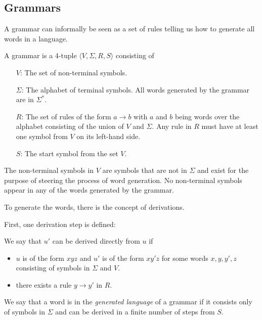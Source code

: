 \subsection{Grammars}\label{subsec:grammars}

A grammar can informally be seen as a set of rules telling us how to generate all words in a language.

\begin{define}[Grammar]
    A grammar is a 4-tuple $\langle V, \Sigma, R, S \rangle$ consisting of
    \begin{itemize}
        \item[$V$:] The set of non-terminal symbols.
        \item[$\Sigma$:] The alphabet of terminal symbols.
        All words generated by the grammar are in $\Sigma^{*}$.
        \item[$R$:] The set of rules of the form $a \to b$ with $a$ and $b$ being words over the alphabet consisting of the union of $V$ and $\Sigma$.
        Any rule in $R$ must have at least one symbol from $V$ on its left-hand side.
        \item[$S$:] The start symbol from the set $V$.
    \end{itemize}
\end{define}

The non-terminal symbols in $V$ are symbols that are not in $\Sigma$ and exist for the purpose of steering the process of word generation.
No non-terminal symbols appear in any of the words generated by the grammar.

To generate the words, there is the concept of derivations.
\begin{define}[Derivation]
    First, one derivation step is defined:

    We say that $u'$ can be derived directly from $u$ if
    \begin{itemize}
        \setlength\itemsep{0.15em}
        \item $u$ is of the form $xyz$ and $u'$ is of the form $xy'z$ for some words $x, y, y', z$ consisting of symbols in $\Sigma$ and $V$.
        \item there exists a rule $y \to y'$ in $R$.
    \end{itemize}

    We say that a word is in the \emph{generated language} of a grammar if it consists only of symbols in $\Sigma$ and can be derived in a finite number of steps from $S$.
\end{define}

